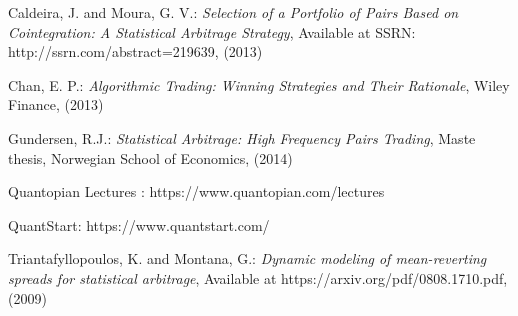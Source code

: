 \documentclass{paper}
\begin{document}
%
%
\begin{thebibliography}{5}

Caldeira, J. and Moura, G. V.: \textit{Selection of a Portfolio of Pairs Based on Cointegration: A Statistical Arbitrage Strategy}, Available at SSRN: http://ssrn.com/abstract=219639, (2013) 

Chan, E. P.: \textit{Algorithmic Trading: Winning Strategies and Their Rationale}, Wiley Finance, (2013)

Gundersen, R.J.: \textit{Statistical Arbitrage: High Frequency Pairs Trading}, Maste thesis, Norwegian School of Economics, (2014)

Quantopian Lectures : https://www.quantopian.com/lectures

QuantStart: https://www.quantstart.com/

Triantafyllopoulos, K. and Montana, G.: \textit{Dynamic modeling of mean-reverting spreads for statistical arbitrage}, Available at https://arxiv.org/pdf/0808.1710.pdf, (2009) 



\end{thebibliography}
\end{document}

